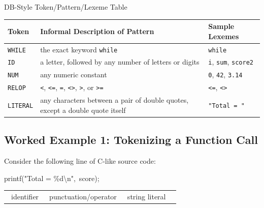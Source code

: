 \documentclass[11pt]{article}
\begin{document}
\begin{examplebox}{DB-Style Token/Pattern/Lexeme Table}
\renewcommand{\arraystretch}{1.3}
\begin{tabularx}{\textwidth}{@{}l X l@{}}
\toprule
\textbf{Token} & \textbf{Informal Description of Pattern} & \textbf{Sample Lexemes} \\
\midrule
\texttt{WHILE} & the exact keyword \texttt{while} & \texttt{while} \\
\texttt{ID} & a letter, followed by any number of letters or digits & \texttt{i}, \texttt{sum}, \texttt{score2} \\
\texttt{NUM} & any numeric constant & \texttt{0}, \texttt{42}, \texttt{3.14} \\
\texttt{RELOP} & \texttt{<}, \texttt{<=}, \texttt{=}, \texttt{<>}, \texttt{>}, or \texttt{>=} & \texttt{<=}, \texttt{<>} \\
\texttt{LITERAL} & any characters between a pair of double quotes, except a double quote itself & \texttt{"Total = "} \\
\bottomrule
\end{tabularx}
\end{examplebox}

\subsection{Worked Example 1: Tokenizing a Function Call}

Consider the following line of C-like source code:

\begin{center}
\ttfamily\large
\colorbox{dbGreenBg}{printf}\colorbox{examRedBg}{(}\colorbox{enrichGoldBg}{"Total = \%d\textbackslash n"}\colorbox{examRedBg}{,}\ \colorbox{dbGreenBg}{score}\colorbox{examRedBg}{)}\colorbox{examRedBg}{;}
\end{center}
\begin{center}
\small\begin{tabular}{@{}p{2.6cm}p{2.6cm}p{2.6cm}p{2.6cm}@{}}
\colorbox{dbGreenBg}{\phantom{x}}\ identifier &
\colorbox{examRedBg}{\phantom{x}}\ punctuation/operator &
\colorbox{enrichGoldBg}{\phantom{x}}\ string literal &
\end{tabular}
\end{center}
\end{document}
